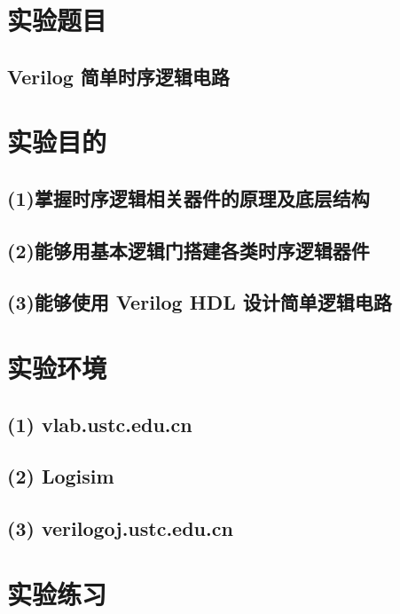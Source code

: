 \documentclass{article}
\begin{document}
    \section{实验题目}
        \subsection*{\qquad Verilog 简单时序逻辑电路}

    \section{实验目的}
        \subsection*{\qquad (1)掌握时序逻辑相关器件的原理及底层结构}
        \subsection*{\qquad (2)能够用基本逻辑门搭建各类时序逻辑器件}
        \subsection*{\qquad (3)能够使用 Verilog HDL 设计简单逻辑电路}
        
    \section{实验环境}
        \subsection*{\qquad (1) vlab.ustc.edu.cn}
        \subsection*{\qquad (2) Logisim}
        \subsection*{\qquad (3) verilogoj.ustc.edu.cn}
    
    \clearpage
    \section{实验练习}
\end{document}
